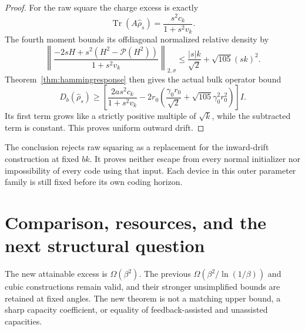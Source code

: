 \documentclass[11pt]{article}
\newcommand{\Tr}{\operatorname{Tr}}
\newcommand{\pin}{\mathcal P}
\begin{document}
\begin{proof}
For the raw square the charge excess is exactly
\[
 \Tr(A\widehat\rho_s)=\frac{s^2c_k}{1+s^2v_k}.
\]
The fourth moment bounds its offdiagonal normalized relative density by
\[
 \left\|\frac{-2sH+s^2(H^2-\pin(H^2))}{1+s^2v_k}\right\|_{2,\sigma}
 \le\frac{|s|k}{\sqrt2}+\sqrt{105}(sk)^2.
\]
Theorem~\ref{thm:hammingresponse} then gives the actual bulk operator bound
\[
 D_b(\widehat\rho_s)\ge
 \left[\frac{2a s^2c_k}{1+s^2v_k}
 -2r_0\left(\frac{\gamma_0r_0}{\sqrt2}
                  +\sqrt{105}\gamma_0^2r_0^2\right)\right]I.
\]
Its first term grows like a strictly positive multiple of \(\sqrt k\),
while the subtracted term is constant. This proves uniform outward drift.
\end{proof}

The conclusion rejects raw squaring as a replacement for the inward-drift
construction at fixed \(bk\). It proves neither escape from every normal
initializer nor impossibility of every code using that input. Each device
in this outer parameter family is still fixed before its own coding horizon.

\section{Comparison, resources, and the next structural question}

The new attainable excess is \(\Omega(\beta^2)\). The previous
\(\Omega(\beta^2/\ln(1/\beta))\) and cubic constructions remain valid,
and their stronger unsimplified bounds are retained at fixed angles.
The new theorem is not a matching upper bound, a sharp capacity coefficient,
or equality of feedback-assisted and unassisted capacities.
\end{document}
